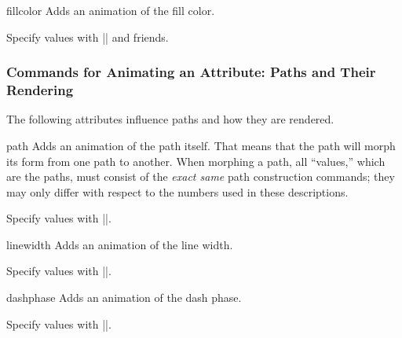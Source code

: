 \begin{sysanimateattribute}{fillcolor}
  Adds an animation of the fill color.
  
  Specify values with |\pgfsys@animation@val@color@rgb| and friends.
\begin{codeexample}[width=2cm]
\end{codeexample}
\end{sysanimateattribute}


\subsubsection{Commands for Animating an Attribute: Paths and Their Rendering}

The following attributes influence paths and how they are rendered.

\begin{sysanimateattribute}{path}
  Adds an animation of the path itself. That means that the path will
  morph its form from one path to another. When morphing a path, all
  ``values,'' which are the paths, must consist of the  \emph{exact
    same} path construction commands; they may only differ with
  respect to the numbers used in these descriptions.
  
  Specify values with |\pgfsys@animation@val@path|.
\begin{codeexample}[width=3.3cm]
\end{codeexample}
\end{sysanimateattribute}

\begin{sysanimateattribute}{linewidth}
  Adds an animation of the line width.
  
  Specify values with |\pgfsys@animation@val@dimension|.
\begin{codeexample}[width=2cm]
\end{codeexample}
\end{sysanimateattribute}

\begin{sysanimateattribute}{dashphase}
  Adds an animation of the dash phase.
  
  Specify values with |\pgfsys@animation@val@dimension|.
\begin{codeexample}[width=2cm]
\end{codeexample}
\end{sysanimateattribute}

